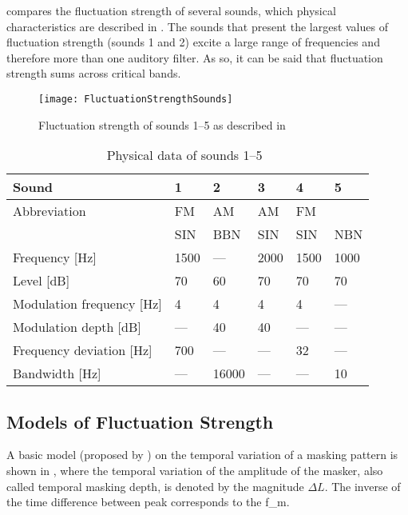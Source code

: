 \documentclass[../main.tex]{subfiles}
\begin{document}
\begin{theoreticalbackground}
 compares the fluctuation strength of several sounds,
which physical characteristics are described in . The
sounds that present the largest values of fluctuation strength (sounds 1 and 2)
excite a large range of frequencies and therefore more than one auditory filter.
As so, it can be said that fluctuation strength sums across critical bands.

\begin{figure}[!ht]
  \centering
  \texttt{[image: FluctuationStrengthSounds]}
  \caption{Fluctuation strength of sounds 1--5 as described in
    ~\cite[pp. 252]{Fastl2007Psychoacoustics}}
\label{fig:flucstrensnds}
\end{figure}

\begin{table}[!ht]
  \centering
  \begin{tabu} to \linewidth{ lXXXXX }
    \toprule
    Sound & 1 & 2 & 3 & 4 & 5 \\
    \midrule
    Abbreviation & FM & AM & AM & FM & \\
    & SIN & BBN & SIN & SIN & NBN \\
    Frequency [Hz] & 1500 & --- & 2000 & 1500 & 1000 \\
    Level [dB] & 70 & 60 & 70 & 70 & 70 \\
    Modulation frequency [Hz] & 4 & 4 & 4 & 4 & --- \\
    Modulation depth [dB] & --- & 40 & 40 & --- & --- \\
    Frequency deviation [Hz] & 700 & --- & --- & 32 & --- \\
    Bandwidth [Hz] & --- & 16000 & --- & --- & 10 \\
    \bottomrule
  \end{tabu}
  \caption{Physical data of sounds
    1--5~\cite[pp. 253]{Fastl2007Psychoacoustics}}
\label{tab:flucstrensnds}
\end{table}

\subsection{Models of Fluctuation Strength}

A basic model (proposed by \textcite[pp.~254]{Fastl2007Psychoacoustics}) on the
temporal variation of a masking pattern is shown in ,
where the temporal variation of the amplitude of the masker, also called
temporal masking depth, is denoted by the magnitude $\Delta L$. The inverse of
the time difference between peak corresponds to the \gls{f_m}.


\end{theoreticalbackground}
\end{document}
